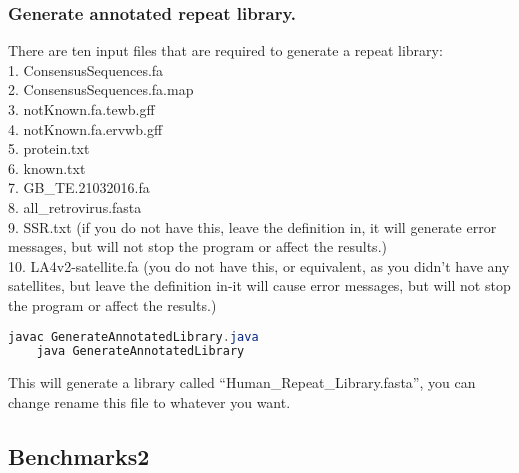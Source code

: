 \documentclass[a4paper,12pt]{article}
\begin{document}
	\subsubsection{Generate annotated repeat library.}
	There are ten input files that are required to generate a repeat library: \\
	1. ConsensusSequences.fa \\
	2. ConsensusSequences.fa.map \\
	3. notKnown.fa.tewb.gff \\
	4. notKnown.fa.ervwb.gff \\
	5. protein.txt \\
	6. known.txt \\
	7. GB\_TE.21032016.fa \\
	8. all\_retrovirus.fasta \\
	9. SSR.txt (if you do not have this, leave the definition in, it will generate error messages, but will not stop the program or affect the results.) \\
	10. LA4v2-satellite.fa (you do not have this, or equivalent, as you didn't have any satellites, but leave the definition in-it will cause error messages, but will not stop the program or affect the results.)
	\begin{lstlisting}[language=java]
	javac GenerateAnnotatedLibrary.java
	java GenerateAnnotatedLibrary \end{lstlisting}
	This will generate a library called \textquotedblleft Human\_Repeat\_Library.fasta\textquotedblright, you can change rename this file to whatever you want.
	
	\subsection{Benchmarks2}
	
\end{document}
